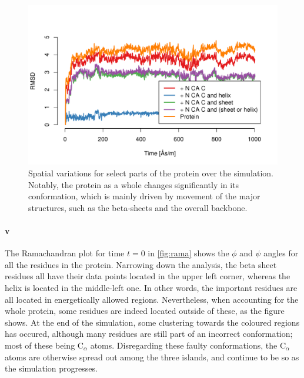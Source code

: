 \documentclass[10pt]{article}\usepackage[]{graphicx}\usepackage[]{color}
\makeatletter
\def\maxwidth{ %
  \ifdim\Gin@nat@width>\linewidth
    \linewidth
  \else
    \Gin@nat@width
  \fi
}
\theoremstyle{plain}
\newcommand{\CA}{C$_\alpha$\xspace}
\makeatother
\begin{document}
\begin{multicols*}{2}
\begin{Schunk}
\begin{figure}[H]

{\centering \includegraphics[width=\maxwidth]{figure/twocolumn-trajs-1} 

}

\caption[Spatial variations for select parts of the protein over the simulation]{Spatial variations for select parts of the protein over the simulation. Notably, the protein as a whole changes significantly in its conformation, which is mainly driven by movement of the major structures, such as the beta-sheets and the overall backbone.}\label{fig:trajs}
\end{figure}
\end{Schunk}
	
	\paragraph*{v}
	The Ramachandran plot for time $t = 0$ in \cref{fig:rama} shows the $\phi$ and $\psi$ angles for all the residues in the protein. Narrowing down the analysis, the beta sheet residues all have their data points located in the upper left corner, whereas the helix is located in the middle-left one. In other words, the important residues are all located in energetically allowed regions. Nevertheless, when accounting for the whole protein, some residues are indeed located outside of these, as the figure shows. At the end of the simulation, some clustering towards the coloured regions has occured, although many residues are still part of an incorrect conformation; most of these being C$_\alpha$ atoms. Disregarding these faulty conformations, the \CA atoms are otherwise spread out among the three islands, and continue to be so as the simulation progresses.
	

\end{multicols*}
\end{document}

